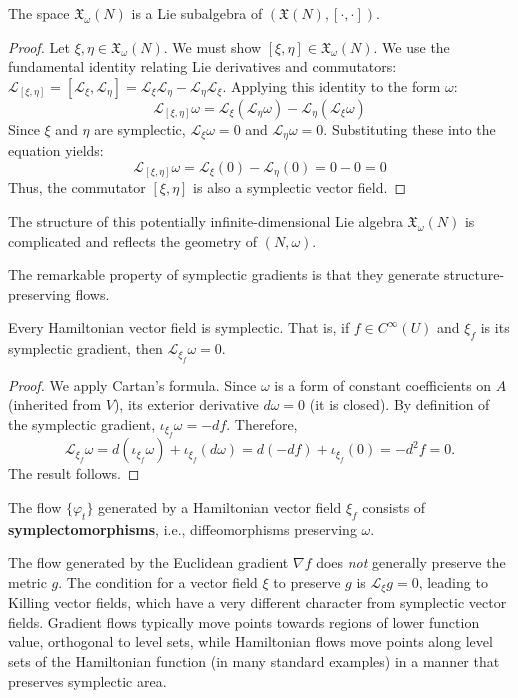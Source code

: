 \begin{proposition}
The space $\mathfrak{X}_{\omega}(N)$ is a Lie subalgebra of $(\mathfrak{X}(N), [\cdot, \cdot])$.
\end{proposition}
\begin{proof}
Let $\xi, \eta \in \mathfrak{X}_{\omega}(N)$. We must show $[\xi, \eta] \in \mathfrak{X}_{\omega}(N)$. We use the fundamental identity relating Lie derivatives and commutators: $\mathcal{L}_{[\xi, \eta]} = [\mathcal{L}_\xi, \mathcal{L}_\eta] = \mathcal{L}_\xi \mathcal{L}_\eta - \mathcal{L}_\eta \mathcal{L}_\xi$. Applying this identity to the form $\omega$:
\[ \mathcal{L}_{[\xi, \eta]} \omega = \mathcal{L}_\xi (\mathcal{L}_\eta \omega) - \mathcal{L}_\eta (\mathcal{L}_\xi \omega) \]
Since $\xi$ and $\eta$ are symplectic, $\mathcal{L}_\xi \omega = 0$ and $\mathcal{L}_\eta \omega = 0$. Substituting these into the equation yields:
\[ \mathcal{L}_{[\xi, \eta]} \omega = \mathcal{L}_\xi (0) - \mathcal{L}_\eta (0) = 0 - 0 = 0 \]
Thus, the commutator $[\xi, \eta]$ is also a symplectic vector field.
\end{proof}
The structure of this potentially infinite-dimensional Lie algebra $\mathfrak{X}_{\omega}(N)$ is complicated and reflects the geometry of $(N, \omega)$.

The remarkable property of symplectic gradients is that they generate structure-preserving flows.

\begin{theorem}
Every Hamiltonian vector field is symplectic. That is, if $f \in C^\infty(U)$ and $\xi_f$ is its symplectic gradient, then $\mathcal{L}_{\xi_f} \omega = 0$.
\end{theorem}
\begin{proof}
We apply Cartan's formula. Since $\omega$ is a form of constant coefficients on $A$ (inherited from $V$), its exterior derivative $d \omega = 0$ (it is closed). By definition of the symplectic gradient, $\iota_{\xi_f} \omega = -d f$.
Therefore,
\[
\mathcal{L}_{\xi_f} \omega = d(\iota_{\xi_f} \omega) + \iota_{\xi_f}(d \omega) = d(-d f) + \iota_{\xi_f}(0) = -d^2 f = 0.
\]
The result follows.
\end{proof}

\begin{corollary}
The flow $\{\varphi_t\}$ generated by a Hamiltonian vector field $\xi_f$ consists of \textbf{symplectomorphisms}, i.e., diffeomorphisms preserving $\omega$.
\end{corollary}

\begin{remark}
The flow generated by the Euclidean gradient $\nabla f$ does \textit{not} generally preserve the metric $g$. The condition for a vector field $\xi$ to preserve $g$ is $\mathcal{L}_\xi g = 0$, leading to Killing vector fields, which have a very different character from symplectic vector fields. Gradient flows typically move points towards regions of lower function value, orthogonal to level sets, while Hamiltonian flows move points along level sets of the Hamiltonian function (in many standard examples) in a manner that preserves symplectic area.
\end{remark}

